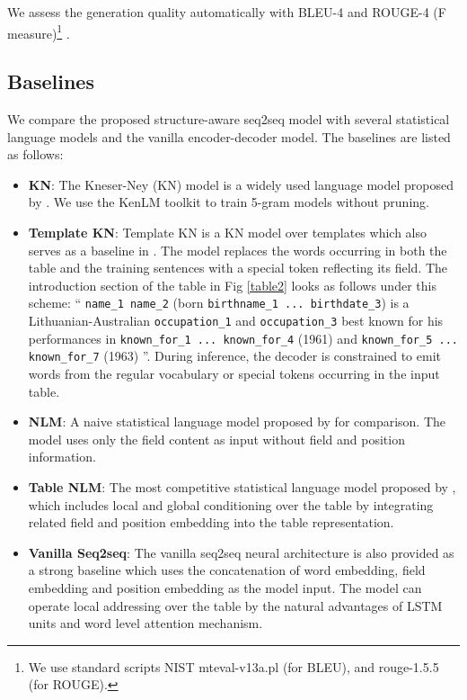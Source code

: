 \documentclass[letterpaper]{article} \usepackage{aaai18}  \usepackage{times}  \usepackage{helvet}  \usepackage{courier}  \usepackage{url}  \usepackage{graphicx}  \frenchspacing  \setlength{\pdfpagewidth}{8.5in}  \setlength{\pdfpageheight}{11in}  \usepackage{amsmath}
\begin{document}
We assess the generation quality automatically with BLEU-4 and ROUGE-4 (F measure)\footnote{We use standard scripts NIST mteval-v13a.pl (for BLEU), and rouge-1.5.5 (for ROUGE).} .    


\subsection{Baselines}
We compare the proposed structure-aware seq2seq model with several statistical language models and the vanilla encoder-decoder model.
The baselines are listed as follows:
\begin{itemize}
	\item \textbf{KN}: The Kneser-Ney (KN) model is a widely used language model proposed by \citeauthor{heafield2013scalable} . We use the KenLM toolkit to train 5-gram models without pruning.
	\item \textbf{Template KN}: Template KN is a KN model over templates which also serves as a baseline in \cite{lebret2016neural}. The model replaces the words occurring in both the table and the training sentences with a special token reflecting its field. The introduction section of the table in Fig \ref{table2} looks as follows under this scheme: `` \texttt{name\_1 name\_2} (born \texttt{birthname\_1 
... birthdate\_3}) is a Lithuanian-Australian \texttt{occupation\_1} and \texttt{occupation\_3} best known for his performances in \texttt{known\_for\_1 ... known\_for\_4} (1961) and \texttt{known\_for\_5 ... known\_for\_7} (1963) ''. During inference, the decoder is constrained to emit words from the regular vocabulary or special tokens occurring in the input table. 
	\item  \textbf{NLM}: A naive statistical language model proposed by \cite{lebret2016neural} for comparison. The model uses only the field content as input without field and position information.
	\item \textbf{Table NLM}: The most competitive statistical language model proposed by \cite{lebret2016neural}, which includes local and global conditioning over the table by integrating related field and position embedding into the table representation.
	\item \textbf{Vanilla Seq2seq}: The vanilla seq2seq neural architecture is also provided as a strong baseline which uses the concatenation of word embedding, field embedding and position embedding as the model input. The model can operate local addressing over the table by the natural advantages of LSTM units and word level attention mechanism. 
\end{itemize}
\end{document}
